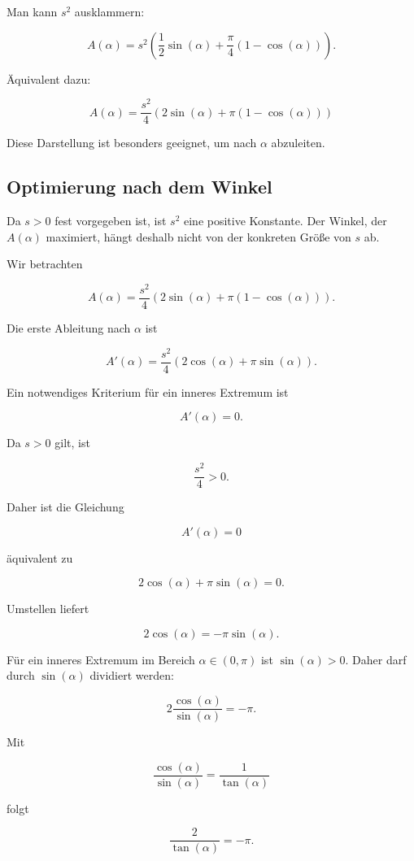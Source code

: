 Man kann \(s^2\) ausklammern:

\[
A(\alpha)
=
s^2
\left(
\frac{1}{2}\sin(\alpha)
+
\frac{\pi}{4}
\left(
1-\cos(\alpha)
\right)
\right).
\]

Äquivalent dazu:

\[
\boxed{
A(\alpha)
=
\frac{s^2}{4}
\left(
2\sin(\alpha)
+
\pi
\left(
1-\cos(\alpha)
\right)
\right)
}
\]

Diese Darstellung ist besonders geeignet, um nach \(\alpha\) abzuleiten.

\subsection{Optimierung nach dem Winkel}

Da \(s>0\) fest vorgegeben ist, ist \(s^2\) eine positive Konstante.
Der Winkel, der \(A(\alpha)\) maximiert, hängt deshalb nicht von der
konkreten Größe von \(s\) ab.

Wir betrachten

\[
A(\alpha)
=
\frac{s^2}{4}
\left(
2\sin(\alpha)
+
\pi
\left(
1-\cos(\alpha)
\right)
\right).
\]

Die erste Ableitung nach \(\alpha\) ist

\[
A'(\alpha)
=
\frac{s^2}{4}
\left(
2\cos(\alpha)
+
\pi \sin(\alpha)
\right).
\]

Ein notwendiges Kriterium für ein inneres Extremum ist

\[
A'(\alpha)=0.
\]

Da \(s>0\) gilt, ist

\[
\frac{s^2}{4}>0.
\]

Daher ist die Gleichung

\[
A'(\alpha)=0
\]

äquivalent zu

\[
2\cos(\alpha)
+
\pi\sin(\alpha)
=
0.
\]

Umstellen liefert

\[
2\cos(\alpha)
=
-\pi\sin(\alpha).
\]

Für ein inneres Extremum im Bereich \(\alpha\in(0,\pi)\) ist
\(\sin(\alpha)>0\). Daher darf durch \(\sin(\alpha)\) dividiert werden:

\[
2\frac{\cos(\alpha)}{\sin(\alpha)}
=
-\pi.
\]

Mit

\[
\frac{\cos(\alpha)}{\sin(\alpha)}
=
\frac{1}{\tan(\alpha)}
\]

folgt

\[
\frac{2}{\tan(\alpha)}
=
-\pi.
\]

